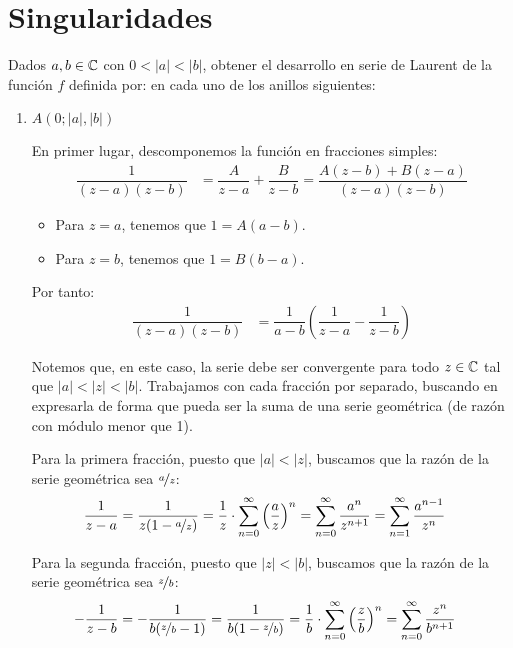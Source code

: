 \section{Singularidades}

\begin{ejercicio}
    Dados $a, b \in \mathbb{C}$ con $0 < |a| < |b|$, obtener el desarrollo en serie de Laurent de la función $f$ definida por:
    en cada uno de los anillos siguientes:
    \begin{enumerate}
        \item $A(0; |a|, |b|)$
        
        En primer lugar, descomponemos la función en fracciones simples:
        \begin{align*}
            \dfrac{1}{(z - a)(z - b)} &= \dfrac{A}{z - a} + \dfrac{B}{z - b}
            = \dfrac{A(z - b) + B(z - a)}{(z - a)(z - b)}
        \end{align*}
        \begin{itemize}
            \item Para $z=a$, tenemos que $1=A(a - b)$.
            \item Para $z=b$, tenemos que $1=B(b - a)$.
        \end{itemize}

        Por tanto:
        \begin{align*}
            \dfrac{1}{(z - a)(z - b)} &= \dfrac{1}{a - b} \left( \dfrac{1}{z - a} - \dfrac{1}{z - b} \right)
        \end{align*}

        Notemos que, en este caso, la serie debe ser convergente para todo $z\in \mathbb{C}$ tal que $|a| < |z| < |b|$. Trabajamos con cada fracción por separado, buscando en expresarla de forma que pueda ser la suma de una serie geométrica (de razón con módulo menor que 1).

        Para la primera fracción, puesto que $|a| < |z|$, buscamos que la razón de la serie geométrica sea $\nicefrac{a}{z}$:
        \begin{align*}
            \dfrac{1}{z - a} &= \dfrac{1}{z(1 - \nicefrac{a}{z})} = \dfrac{1}{z} \cdot \sum_{n=0}^{\infty} \left( \frac{a}{z} \right)^n = \sum_{n=0}^{\infty} \frac{a^n}{z^{n+1}} = \sum_{n=1}^{\infty} \frac{a^{n-1}}{z^n}
        \end{align*}

        Para la segunda fracción, puesto que $|z| < |b|$, buscamos que la razón de la serie geométrica sea $\nicefrac{z}{b}$:
        \begin{align*}
            -\dfrac{1}{z - b} &= -\dfrac{1}{b(\nicefrac{z}{b} - 1)} = \dfrac{1}{b(1 - \nicefrac{z}{b})} = \dfrac{1}{b}\cdot \sum_{n=0}^{\infty} \left( \frac{z}{b} \right)^n = \sum_{n=0}^{\infty} \frac{z^n}{b^{n+1}}
        \end{align*}


\end{enumerate}
\end{ejercicio}
